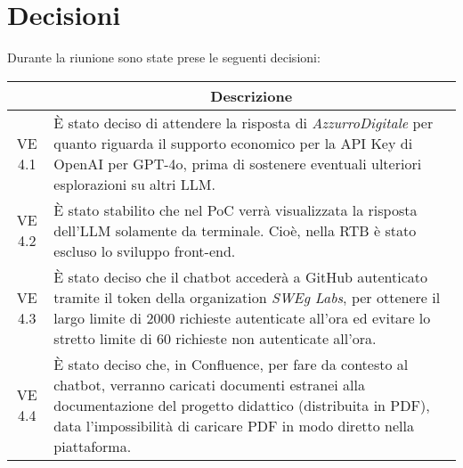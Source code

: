 

\section{Decisioni}

Durante la riunione sono state prese le seguenti decisioni:

\vspace{0.5cm}

\begin{table}[htbp]
    \centering
    \begin{tabular}{|c|p{}|}
        \hline
        \rowcolor[gray]{0.75}
        \multicolumn{1}{|c|}{\textbf{Codice}} & \multicolumn{1}{|c|}{\textbf{Descrizione}}\\
        \hline
        VE 4.1 & È stato deciso di attendere la risposta di \emph{AzzurroDigitale} per quanto riguarda il supporto economico
        per la API Key di OpenAI per GPT-4o, prima di sostenere eventuali ulteriori esplorazioni su altri LLM. \\
        \hline
        VE 4.2 & È stato stabilito che nel PoC verrà visualizzata la risposta dell'LLM solamente da terminale.
        Cioè, nella RTB è stato escluso lo sviluppo front-end. \\
        \hline
        VE 4.3 & È stato deciso che il chatbot accederà a GitHub autenticato tramite il token della organization \emph{SWEg Labs},
        per ottenere il largo limite di 2000 richieste autenticate all'ora ed evitare lo stretto limite di 60 richieste non autenticate all'ora. \\
        \hline
        VE 4.4 & È stato deciso che, in Confluence, per fare da contesto al chatbot, verranno caricati documenti estranei alla documentazione del progetto didattico
        (distribuita in PDF), data l'impossibilità di caricare PDF in modo diretto nella piattaforma. \\
        \hline
    \end{tabular}
\end{table}
